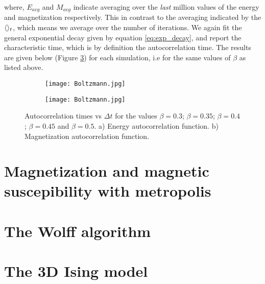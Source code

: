 \documentclass[11pt,a4paper]{article}
\DeclarePairedDelimiter{\avg}{\langle}{\rangle}
\begin{document}
where, $E_{avg}$ and $M_{avg}$ indicate averaging over the \textit{last} million values of the energy and magnetization
 respectively. This in contrast to the averaging indicated by the $\avg{}_t$, which means we average over the number of
 iterations. We again fit the general exponential decay given by equation \ref{eq:exp_decay}, and report the characteristic
 time, which is by definition the autocorrelation time. The results are given below (Figure \ref{fig:autocorr})
 for each simulation, i.e for the same values of $\beta$ as listed above.
 
\begin{figure}[h!]
\centering
\begin{subfigure}{.5\textwidth}
  \centering
  \texttt{[image: Boltzmann.jpg]}
  \caption{}
  \label{fig:autocorr_energy}
\end{subfigure}%
\begin{subfigure}{.5\textwidth}
  \centering
  \texttt{[image: Boltzmann.jpg]}
  \caption{}
  \label{fig:autocorr_mag}
\end{subfigure}
\caption{Autocorrelation times vs $\Delta t$ for the values $\beta = 0.3$; $\beta = 0.35$;
         $\beta = 0.4$; $\beta = 0.45$ and $\beta = 0.5$. a) Energy autocorrelation function. 
         b) Magnetization autocorrelation function.}
\label{fig:autocorr}
\end{figure}


\section{Magnetization and magnetic suscepibility with metropolis}

\section{The Wolff algorithm}

\section{The 3D Ising model}
\end{document}
